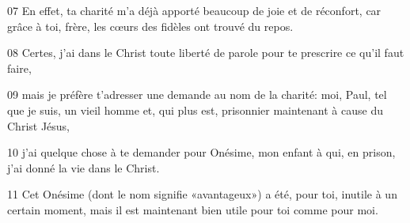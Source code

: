 
07 En effet, ta charité m’a déjà apporté beaucoup de joie et de réconfort, car grâce à toi, frère, les cœurs des fidèles ont trouvé du repos.

08 Certes, j’ai dans le Christ toute liberté de parole pour te prescrire ce qu’il faut faire,

09 mais je préfère t’adresser une demande au nom de la charité: moi, Paul, tel que je suis, un vieil homme et, qui plus est, prisonnier maintenant à cause du Christ Jésus,

10 j’ai quelque chose à te demander pour Onésime, mon enfant à qui, en prison, j’ai donné la vie dans le Christ.

11 Cet Onésime (dont le nom signifie «avantageux») a été, pour toi, inutile à un certain moment, mais il est maintenant bien utile pour toi comme pour moi.
